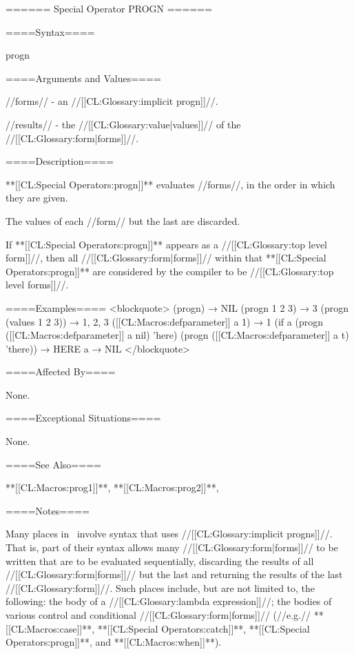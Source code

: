 ====== Special Operator PROGN ======

====Syntax====

\DefspecWithValues progn {} {}

====Arguments and Values====

//forms// - an //[[CL:Glossary:implicit progn]]//.

//results// - the //[[CL:Glossary:value|values]]// of the //[[CL:Glossary:form|forms]]//.

====Description====

**[[CL:Special Operators:progn]]** evaluates //forms//, in the order in which they are given.

The values of each //form// but the last are discarded.

If **[[CL:Special Operators:progn]]** appears as a //[[CL:Glossary:top level form]]//, then all //[[CL:Glossary:form|forms]]// within that **[[CL:Special Operators:progn]]** are considered by the compiler to be //[[CL:Glossary:top level forms]]//.

====Examples==== <blockquote> (progn) → NIL (progn 1 2 3) → 3 (progn (values 1 2 3)) → 1, 2, 3 ([[CL:Macros:defparameter]] a 1) → 1 (if a (progn ([[CL:Macros:defparameter]] a nil) 'here) (progn ([[CL:Macros:defparameter]] a t) 'there)) → HERE a → NIL </blockquote>

====Affected By====

None.

====Exceptional Situations====

None.

====See Also====

**[[CL:Macros:prog1]]**, **[[CL:Macros:prog2]]**, {\secref\Evaluation}

====Notes====

Many places in \clisp\ involve syntax that uses //[[CL:Glossary:implicit progns]]//. That is, part of their syntax allows many //[[CL:Glossary:form|forms]]// to be written that are to be evaluated sequentially, discarding the results of all //[[CL:Glossary:form|forms]]// but the last and returning the results of the last //[[CL:Glossary:form]]//. Such places include, but are not limited to, the following: the body of a //[[CL:Glossary:lambda expression]]//; the bodies of various control and conditional //[[CL:Glossary:form|forms]]// (//e.g.// **[[CL:Macros:case]]**, **[[CL:Special Operators:catch]]**, **[[CL:Special Operators:progn]]**, and **[[CL:Macros:when]]**).

